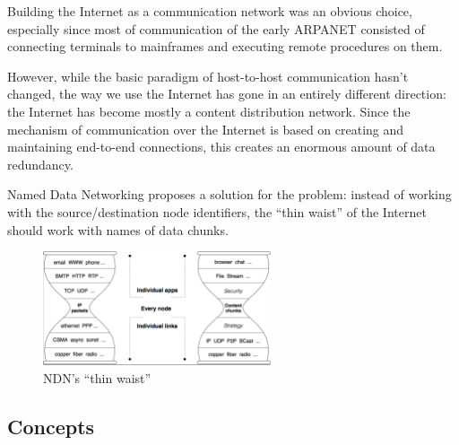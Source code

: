             Building the Internet as a communication network was an obvious choice, especially since most of communication of the early ARPANET consisted of connecting terminals to mainframes and executing remote procedures on them.

            However, while the basic paradigm of host-to-host communication hasn't changed, the way we use the Internet has gone in an entirely different direction: the Internet has become mostly a content distribution network. Since the mechanism of communication over the Internet is based on creating and maintaining end-to-end connections, this creates an enormous amount of data redundancy.

            Named Data Networking proposes a solution for the problem: instead of working with the source/destination node identifiers, the ``thin waist'' of the Internet should work with names of data chunks.

            \begin{figure}[H]
                \begin{center}
                    \includegraphics[width=0.6\textwidth]{fig/ndn_hourglass2.png}
                  \caption{NDN's ``thin waist''}
                  \label{ndn-hourglass2}
                \end{center}
            \end{figure}

        \subsection{Concepts}
